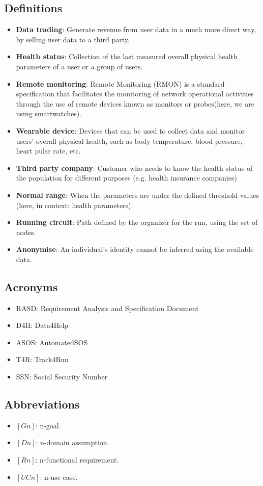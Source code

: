 \documentclass[hidelinks, 12pt]{report}
\begin{document}
	\subsection{Definitions}
	\begin{itemize}
		\item{\textbf{Data trading}}: Generate revenue from user data in a much more direct way, by selling user data to a third party.
		\item{\textbf{Health status}}: Collection of the last measured overall physical health parameters of a user or a group of users.
		\item{\textbf{Remote monitoring}}: Remote Monitoring (RMON) is a standard specification that facilitates the monitoring of network operational activities through the use of remote devices known as monitors or probes(here, we are using smartwatches).
		\item{\textbf{Wearable device}}: Devices that can be used to collect data and monitor users' overall physical health, such as body temperature, blood pressure, heart pulse rate, etc.
		\item{\textbf{Third party company}}: Customer who needs to know the health status of the population for different purposes (e.g. health insurance companies)
		\item{\textbf{Normal range}}: When the parameters are under the defined threshold values (here, in context: health parameters).
		\item{\textbf{Running circuit}}: Path defined by the organizer for the run, using the set of nodes.
		\item{\textbf{Anonymise}}: An individual's identity cannot be inferred using the available data.
	\end{itemize}
	
	\subsection{Acronyms}
	\begin{itemize}
		\item{RASD}: Requirement Analysis and Specification Document
		\item{D4H}: Data4Help
		\item{ASOS}: AutomatedSOS
		\item{T4R}: Track4Run
		\item{SSN}: Social Security Number
	\end{itemize}
	
	\subsection{Abbreviations}
	\begin{itemize}
		\item $[Gn]$: n-goal.
		\item $[Dn]$: n-domain assumption.
		\item $[Rn]$: n-functional requirement.
		\item $[UCn]$: n-use case.
	\end{itemize}
	
\end{document}
